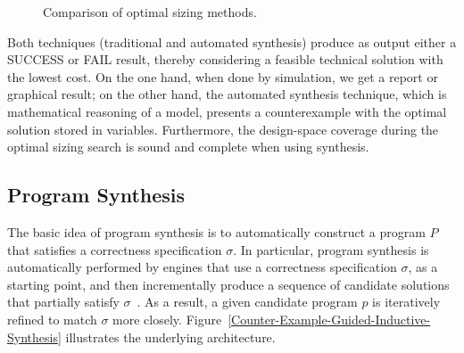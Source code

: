 \documentclass[runningheads]{llncs}
\begin{document}
\begin{figure}[h]
\centering
\caption{Comparison of optimal sizing methods.}
\label{fig:optimization}
\end{figure}

Both techniques (traditional and automated synthesis) produce as output either a SUCCESS or FAIL result, thereby considering a feasible technical solution with the lowest cost. On the one hand, when done by simulation, we get a report or graphical result; on the other hand, the automated synthesis technique, which is mathematical reasoning of a model, presents a counterexample with the optimal solution stored in variables. Furthermore, the design-space coverage during the optimal sizing search is sound and complete when using synthesis.

\subsection{Program Synthesis}
\label{sec:ProgramSynthesis}
The basic idea of program synthesis is to automatically construct a program $P$ that satisfies a correctness specification $\sigma$. In particular, program synthesis is automatically performed by engines that use a correctness specification $\sigma$, as a starting point, and then incrementally produce a sequence of candidate solutions that partially satisfy $\sigma$~\cite{Abateetal2017}. As a result, a given candidate program $p$ is iteratively refined to match $\sigma$ more closely. Figure~\ref{Counter-Example-Guided-Inductive-Synthesis} illustrates the underlying architecture. 
\end{document}
